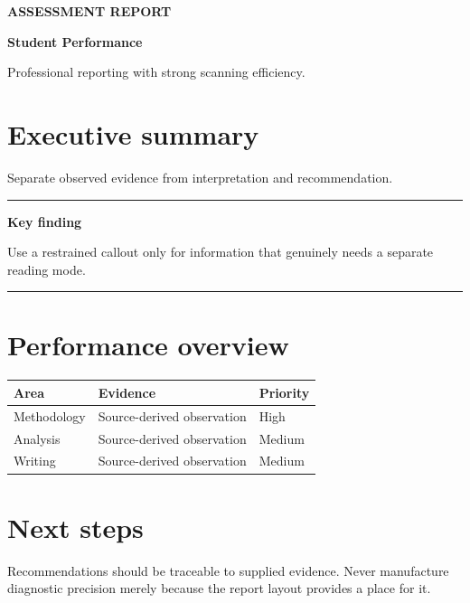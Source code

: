 \documentclass[11pt,a4paper]{scrartcl}
\newenvironment{finding}[1]
{\par\medskip\noindent\begin{minipage}{\linewidth}
 \color{Accent}\rule{\linewidth}{0.5pt}\par\smallskip
 {\sffamily\bfseries #1}\par\smallskip\normalcolor}
{\par\smallskip\color{Accent}\rule{\linewidth}{0.5pt}\normalcolor
 \end{minipage}\par\medskip}
\begin{document}
{\small\sffamily\bfseries\color{Muted}ASSESSMENT REPORT\par}
\vspace{0.4\baselineskip}
{\Huge\bfseries Student Performance\par}
\vspace{0.5\baselineskip}
{\large\color{Muted}Professional reporting with strong scanning efficiency.\par}

\vspace{2\baselineskip}

\section{Executive summary}
Separate observed evidence from interpretation and recommendation.

\begin{finding}{Key finding}
Use a restrained callout only for information that genuinely needs a separate reading mode.
\end{finding}

\section{Performance overview}
\begin{tabularx}{\linewidth}{@{}Xll@{}}
\toprule
Area & Evidence & Priority \\
\midrule
Methodology & Source-derived observation & High \\
Analysis & Source-derived observation & Medium \\
Writing & Source-derived observation & Medium \\
\bottomrule
\end{tabularx}

\section{Next steps}
Recommendations should be traceable to supplied evidence. Never manufacture diagnostic
precision merely because the report layout provides a place for it.
\end{document}
